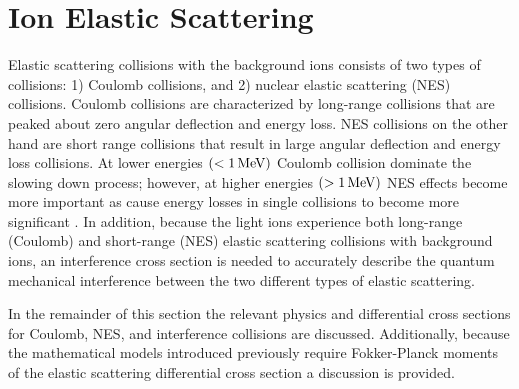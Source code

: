 \section{Ion Elastic Scattering}
Elastic scattering collisions with the background ions consists of two types of collisions: 1) Coulomb collisions, and 2) nuclear elastic scattering (NES) collisions. Coulomb collisions are characterized by long-range collisions that are peaked about zero angular deflection and energy loss. NES collisions on the other hand are short range collisions that result in large angular deflection and energy loss collisions. At lower energies $(< 1 \,\text{MeV})$ Coulomb collision dominate the slowing down process; however, at higher energies $(> 1 \,\text{MeV})$ NES effects become more important as cause energy losses in single collisions to become more significant \cite{Hale-1983}. In addition, because the light ions experience both long-range (Coulomb) and short-range (NES) elastic scattering collisions with background ions, an interference cross section is needed to accurately describe the quantum mechanical interference between the two different types of elastic scattering.

In the remainder of this section the relevant physics and differential cross sections for Coulomb, NES, and interference collisions are discussed. Additionally, because the mathematical models introduced previously require Fokker-Planck moments of the elastic scattering differential cross section a discussion is provided.








